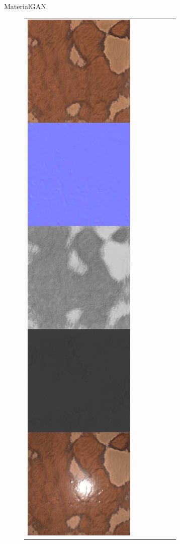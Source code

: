 \documentclass[final]{beamer}
\newlength{\twocolwid}
\newlength{\resLen}
\begin{document}
\begin{frame}[t]
\begin{columns}[t]
\begin{column}{\twocolwid}
\begin{block}{MaterialGAN}
\begin{figure}
\begin{tabular}{ccccccc}
					\includegraphics[width=\resLen]{others/matgan/10.jpg} &

\end{tabular}
\end{figure}
\end{block}
\end{column}
\end{columns}
\end{frame}
\end{document}
